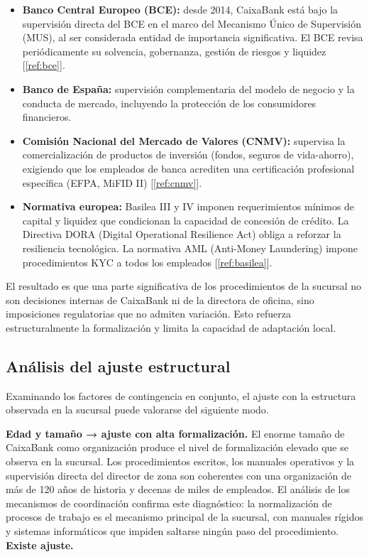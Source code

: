\begin{itemize}
  \item \textbf{Banco Central Europeo (BCE):} desde 2014, CaixaBank está bajo la
    supervisión directa del BCE en el marco del Mecanismo Único de Supervisión (MUS),
    al ser considerada entidad de importancia significativa. El BCE revisa periódicamente
    su solvencia, gobernanza, gestión de riesgos y liquidez [\ref{ref:bce}].
  \item \textbf{Banco de España:} supervisión complementaria del modelo de negocio y
    la conducta de mercado, incluyendo la protección de los consumidores financieros.
  \item \textbf{Comisión Nacional del Mercado de Valores (CNMV):} supervisa la
    comercialización de productos de inversión (fondos, seguros de vida-ahorro), exigiendo
    que los empleados de banca acrediten una certificación profesional específica (EFPA,
    MiFID II) [\ref{ref:cnmv}].
  \item \textbf{Normativa europea:} Basilea III y IV imponen requerimientos mínimos de
    capital y liquidez que condicionan la capacidad de concesión de crédito. La Directiva
    DORA (Digital Operational Resilience Act) obliga a reforzar la resiliencia tecnológica.
    La normativa AML (Anti-Money Laundering) impone procedimientos KYC a todos los
    empleados [\ref{ref:basilea}].
\end{itemize}

El resultado es que una parte significativa de los procedimientos de la sucursal no son
decisiones internas de CaixaBank ni de la directora de oficina, sino imposiciones
regulatorias que no admiten variación. Esto refuerza estructuralmente la formalización
y limita la capacidad de adaptación local.

\subsection{Análisis del ajuste estructural}

Examinando los factores de contingencia en conjunto, el ajuste con la estructura observada
en la sucursal puede valorarse del siguiente modo.

\textbf{Edad y tamaño → ajuste con alta formalización.} El enorme tamaño de CaixaBank
como organización produce el nivel de formalización elevado que se observa en la sucursal.
Los procedimientos escritos, los manuales operativos y la supervisión directa del director
de zona son coherentes con una organización de más de 120 años de historia y decenas de
miles de empleados. El análisis de los mecanismos de coordinación confirma este diagnóstico:
la normalización de procesos de trabajo es el mecanismo principal de la sucursal, con manuales
rígidos y sistemas informáticos que impiden saltarse ningún paso del procedimiento. \textbf{Existe ajuste.}

